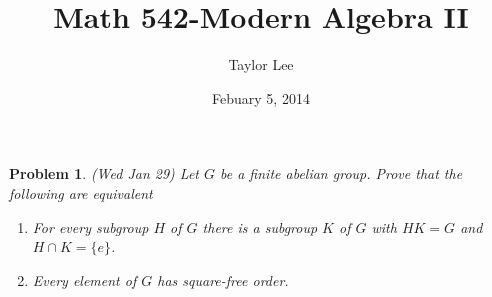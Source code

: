 \documentclass[12pt]{article}
\theoremstyle{moo}
\newtheorem*{prob}{Problem}
\begin{document}
\fontseries {\seriesdefault}
\fontshape {\shapedefault}
\selectfont

\title{ Math 542-Modern Algebra II}
\date{Febuary 5, 2014}         %
\author{Taylor Lee}      %
\maketitle                      %

\begin{prob}(Wed Jan 29)
Let $G$ be a finite abelian group.  Prove that the following are equivalent
\begin{enumerate}
\item For every subgroup $H$ of $G$ there is a subgroup $K$ of $G$ with
$HK=G$ and $H\cap K=\{e\}$. 
\item Every  element of $G$ has square-free order.
\end{enumerate}
\end{prob}
\end{document}

